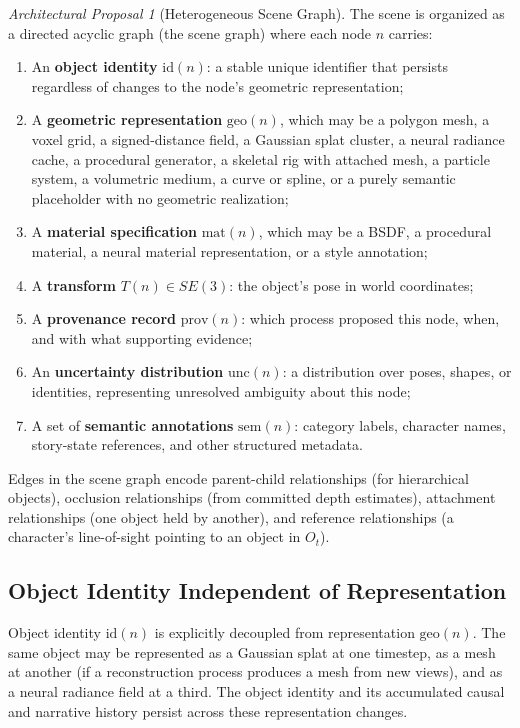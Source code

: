 \documentclass[12pt,a4paper]{article}
\theoremstyle{plain}
\theoremstyle{definition}
\theoremstyle{remark}
\newtheorem{proposal}[theorem]{Architectural Proposal}
\begin{document}
\begin{proposal}[Heterogeneous Scene Graph]
The scene is organized as a directed acyclic graph (the scene graph) where each node $n$ carries:
\begin{enumerate}[leftmargin=2em,itemsep=0pt]
\item An \textbf{object identity} $\mathrm{id}(n)$: a stable unique identifier that persists regardless of changes to the node's geometric representation;
\item A \textbf{geometric representation} $\mathrm{geo}(n)$, which may be a polygon mesh, a voxel grid, a signed-distance field, a Gaussian splat cluster, a neural radiance cache, a procedural generator, a skeletal rig with attached mesh, a particle system, a volumetric medium, a curve or spline, or a purely semantic placeholder with no geometric realization;
\item A \textbf{material specification} $\mathrm{mat}(n)$, which may be a BSDF, a procedural material, a neural material representation, or a style annotation;
\item A \textbf{transform} $T(n) \in SE(3)$: the object's pose in world coordinates;
\item A \textbf{provenance record} $\mathrm{prov}(n)$: which process proposed this node, when, and with what supporting evidence;
\item An \textbf{uncertainty distribution} $\mathrm{unc}(n)$: a distribution over poses, shapes, or identities, representing unresolved ambiguity about this node;
\item A set of \textbf{semantic annotations} $\mathrm{sem}(n)$: category labels, character names, story-state references, and other structured metadata.
\end{enumerate}
Edges in the scene graph encode parent-child relationships (for hierarchical objects), occlusion relationships (from committed depth estimates), attachment relationships (one object held by another), and reference relationships (a character's line-of-sight pointing to an object in $O_t$).
\end{proposal}

\subsection{Object Identity Independent of Representation}

Object identity $\mathrm{id}(n)$ is explicitly decoupled from representation $\mathrm{geo}(n)$. The same object may be represented as a Gaussian splat at one timestep, as a mesh at another (if a reconstruction process produces a mesh from new views), and as a neural radiance field at a third. The object identity and its accumulated causal and narrative history persist across these representation changes.
\end{document}
